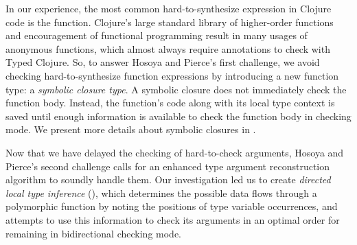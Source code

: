 In our experience, the most common hard-to-synthesize expression in Clojure code
is the function.
Clojure's large standard library of higher-order functions and encouragement
of functional programming result in many usages of anonymous functions, which almost
always require annotations to check with Typed Clojure.
So, to answer Hosoya and Pierce's first challenge, 
we avoid checking hard-to-synthesize function expressions by
introducing a new function type: a \emph{symbolic closure type}.
A symbolic closure does not immediately check the function body. Instead,
the function's code along with its local type context is saved
until enough information is available to check
the function body in checking mode.
We present more details about symbolic closures in .

Now that we have delayed the checking of hard-to-check arguments,
Hosoya and Pierce's second challenge calls for an enhanced
type argument reconstruction algorithm to soundly handle
them.
Our investigation led us to create \emph{directed local type inference}
(),
which determines the possible data flows through a polymorphic function
by noting the positions of type variable occurrences, and attempts to
use this information to check its arguments in an optimal order for remaining
in bidirectional checking mode.

%


